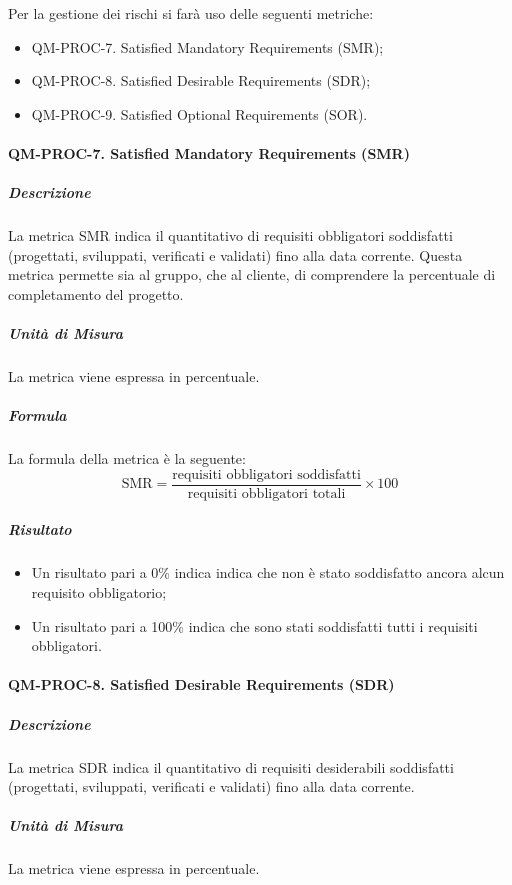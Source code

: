 		Per la gestione dei rischi si farà uso delle seguenti metriche:

		\begin{itemize}
			\item QM-PROC-7. Satisfied Mandatory Requirements (SMR);
			\item QM-PROC-8. Satisfied Desirable Requirements (SDR);
			\item QM-PROC-9. Satisfied Optional Requirements (SOR).
		\end{itemize}

		\paragraph{QM-PROC-7. Satisfied Mandatory Requirements (SMR)}

			\subparagraph{Descrizione}
			La metrica SMR indica il quantitativo di requisiti obbligatori soddisfatti (progettati, sviluppati, verificati e validati) fino alla data corrente. Questa metrica permette sia al gruppo, che al cliente, di comprendere la percentuale di completamento del progetto.

			\subparagraph{Unità di Misura}
			La metrica viene espressa in percentuale.

			\subparagraph{Formula}
			La formula della metrica è la seguente:
			\[
				\text{SMR} = \frac{\text{requisiti obbligatori soddisfatti}}{\text{requisiti obbligatori totali}} \times 100
			\]

			\subparagraph{Risultato}
			\begin{itemize}
				\item Un risultato pari a 0\% indica indica che non è stato soddisfatto ancora alcun requisito obbligatorio;
				\item Un risultato pari a 100\% indica che sono stati soddisfatti tutti i requisiti obbligatori.
			\end{itemize}

		\paragraph{QM-PROC-8. Satisfied Desirable Requirements (SDR)}

			\subparagraph{Descrizione}
			La metrica SDR indica il quantitativo di requisiti desiderabili soddisfatti (progettati, sviluppati, verificati e validati) fino alla data corrente.

			\subparagraph{Unità di Misura}
			La metrica viene espressa in percentuale.

